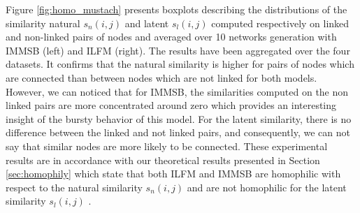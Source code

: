 Figure \ref{fig:homo_mustach} presents boxplots describing the distributions of the similarity natural $s_n(i,j)$ and latent $s_l(i,j)$ computed respectively on linked and non-linked pairs of nodes and averaged over 10 networks generation with IMMSB (left) and ILFM (right). The results have been aggregated over the four datasets.  It confirms that the natural similarity is  higher for  pairs of nodes which are connected than between nodes which are not linked for both models. However, we can noticed that for IMMSB, the similarities computed on the non linked pairs are more concentrated around zero which provides an interesting insight of the bursty behavior of this model. For the latent similarity,  there is no difference between the linked and not linked pairs, and consequently, we can not say that similar nodes are more likely to be connected. These experimental results are in accordance with our theoretical results presented in Section \ref{sec:homophily} which state that both ILFM and IMMSB are homophilic with respect to the natural similarity $s_n(i,j)$ and are not homophilic for the latent similarity $s_l(i,j)$ .
